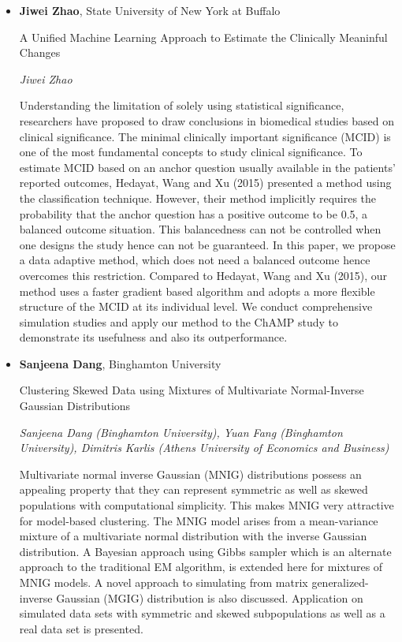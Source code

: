 \begin{itemize}
\item \textbf{Jiwei Zhao}, State University of New York at Buffalo

A Unified Machine Learning Approach to Estimate the Clinically Meaninful Changes

\emph{\footnotesize Jiwei Zhao}

Understanding the limitation of solely using statistical significance, researchers have proposed to draw conclusions in biomedical studies based on clinical significance. The minimal clinically important significance (MCID) is one of the most fundamental concepts to study clinical significance. To estimate MCID based on an anchor question usually available in the patients' reported outcomes, Hedayat, Wang and Xu (2015) presented a method using the classification technique. However, their method implicitly requires the probability that the anchor question has a positive outcome to be 0.5, a balanced outcome situation. This balancedness can not be controlled when one designs the study hence can not be guaranteed. In this paper, we propose a data adaptive method,  which does not need a balanced outcome hence overcomes this restriction. Compared to Hedayat, Wang and Xu (2015), our method uses a faster gradient based algorithm and adopts a more flexible structure of the MCID at its individual level. We conduct comprehensive simulation studies and apply our method to the ChAMP study to demonstrate its usefulness and also its outperformance.

\item \textbf{Sanjeena Dang}, Binghamton University

Clustering Skewed Data using Mixtures of Multivariate Normal-Inverse Gaussian Distributions

\emph{\footnotesize Sanjeena Dang (Binghamton University), Yuan Fang (Binghamton University), Dimitris Karlis (Athens University of Economics and Business)}

Multivariate normal inverse Gaussian (MNIG) distributions possess an appealing property that they can represent symmetric as well as skewed populations with computational simplicity. This makes MNIG very attractive for model-based clustering. The MNIG model arises from a mean-variance mixture of a multivariate normal distribution with the inverse Gaussian distribution. A Bayesian approach using Gibbs sampler which is an alternate approach to the traditional EM algorithm, is extended here for mixtures of MNIG models. A novel approach to simulating from matrix generalized-inverse Gaussian (MGIG) distribution is also discussed. Application on simulated data sets with symmetric and skewed subpopulations as well as a real data set is presented.


\end{itemize}
